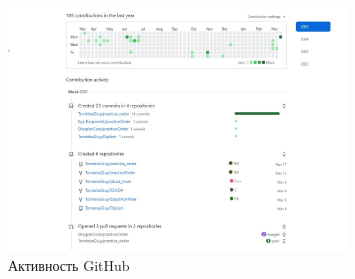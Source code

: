 {\begin{figure}[h]
  \centering
  \includegraphics[width=0.8\textwidth]{img/activity.jpg}
  \caption{Активность GitHub}
  \label{fig:example}
\end{figure}


\par }
